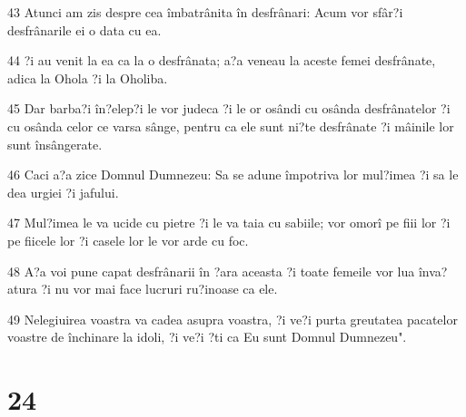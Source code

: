\par 43 Atunci am zis despre cea îmbatrânita în desfrânari: Acum vor sfâr?i desfrânarile ei o data cu ea.
\par 44 ?i au venit la ea ca la o desfrânata; a?a veneau la aceste femei desfrânate, adica la Ohola ?i la Oholiba.
\par 45 Dar barba?i în?elep?i le vor judeca ?i le or osândi cu osânda desfrânatelor ?i cu osânda celor ce varsa sânge, pentru ca ele sunt ni?te desfrânate ?i mâinile lor sunt însângerate.
\par 46 Caci a?a zice Domnul Dumnezeu: Sa se adune împotriva lor mul?imea ?i sa le dea urgiei ?i jafului.
\par 47 Mul?imea le va ucide cu pietre ?i le va taia cu sabiile; vor omorî pe fiii lor ?i pe fiicele lor ?i casele lor le vor arde cu foc.
\par 48 A?a voi pune capat desfrânarii în ?ara aceasta ?i toate femeile vor lua înva?atura ?i nu vor mai face lucruri ru?inoase ca ele.
\par 49 Nelegiuirea voastra va cadea asupra voastra, ?i ve?i purta greutatea pacatelor voastre de închinare la idoli, ?i ve?i ?ti ca Eu sunt Domnul Dumnezeu".

\chapter{24}

